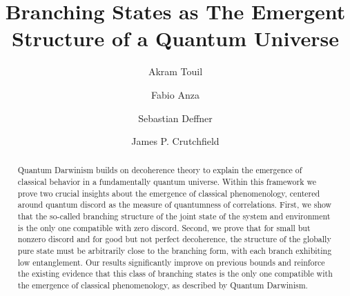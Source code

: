 \documentclass[a4paper,11pt,accepted=2024-09-14]{quantumarticle}
\newcommand{\+}         {\dagger}
\begin{document}
	
	
\title{Branching States as The Emergent Structure of a Quantum Universe}
	
	\author{Akram Touil}
	\author{Fabio Anza}
    
    
    \author{Sebastian Deffner}
    
    \author{James P. Crutchfield}
	
	
\begin{abstract} 
Quantum Darwinism builds on decoherence theory to explain the emergence of classical behavior in a fundamentally quantum universe. {Within this framework we prove two crucial insights about the emergence of classical phenomenology, centered around quantum discord as the measure of quantumness of correlations.} First, we show that the so-called branching structure of the joint state of the system and environment is the only one compatible with zero discord. Second, we prove that for small but nonzero discord and for good but not perfect decoherence, the structure of the globally pure state must be arbitrarily close to the branching form, with each branch exhibiting low entanglement. Our results significantly improve on previous bounds and reinforce the existing evidence that this class of branching states is the only one compatible with the emergence of classical phenomenology, as described by Quantum Darwinism.
\end{abstract}
	
\end{document}
